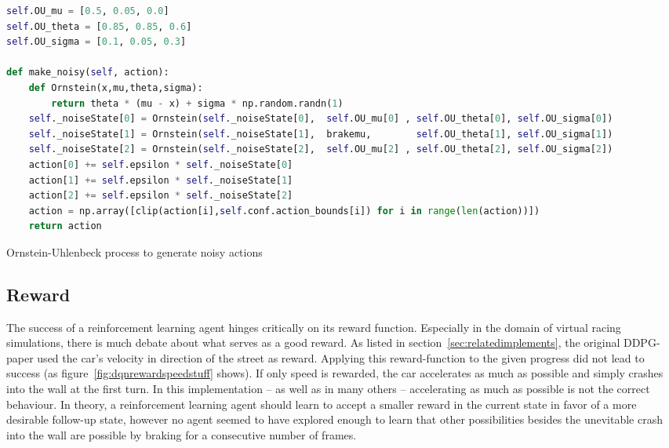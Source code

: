 \begin{algorithm}[h]
	\begin{lstlisting}[language=Python, style=Python, frame=none]
self.OU_mu = [0.5, 0.05, 0.0]
self.OU_theta = [0.85, 0.85, 0.6]
self.OU_sigma = [0.1, 0.05, 0.3]

def make_noisy(self, action):
	def Ornstein(x,mu,theta,sigma):
		return theta * (mu - x) + sigma * np.random.randn(1)
	self._noiseState[0] = Ornstein(self._noiseState[0],  self.OU_mu[0] , self.OU_theta[0], self.OU_sigma[0])
	self._noiseState[1] = Ornstein(self._noiseState[1],  brakemu,        self.OU_theta[1], self.OU_sigma[1])  
	self._noiseState[2] = Ornstein(self._noiseState[2],  self.OU_mu[2] , self.OU_theta[2], self.OU_sigma[2])
	action[0] += self.epsilon * self._noiseState[0]
	action[1] += self.epsilon * self._noiseState[1]
	action[2] += self.epsilon * self._noiseState[2]
	action = np.array([clip(action[i],self.conf.action_bounds[i]) for i in range(len(action))])
	return action
	\end{lstlisting}%
	\caption{Ornstein-Uhlenbeck process to generate noisy actions}
	\label{alg:ornstein}
\end{algorithm}


\subsection{Reward}
		
\label{sec:reward}		
		
The success of a reinforcement learning agent hinges critically on its reward function. Especially in the domain of virtual racing simulations, there is much debate about what serves as a good reward. As listed in section~\ref{sec:relatedimplements}, the original DDPG-paper \cite{lillicrap_continuous_2015} used the car's velocity in direction of the street as reward. Applying this reward-function to the given progress did not lead to success (as figure~\ref{fig:dqnrewardspeedstuff} shows). If only speed is rewarded, the car accelerates as much as possible and simply crashes into the wall at the first turn. In this implementation -- as well as in many others -- accelerating as much as possible is not the correct behaviour. In theory, a reinforcement learning agent should learn to accept a smaller reward in the current state in favor of a more desirable follow-up state, however no agent seemed to have explored enough to learn that other possibilities besides the unevitable crash into the wall are possible by braking for a consecutive number of frames. 

